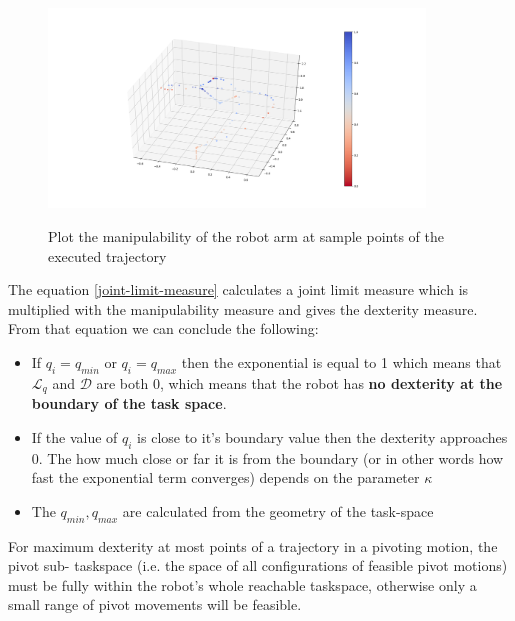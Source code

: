 \begin{center}
\begin{figure}[H]
\centering
\includegraphics[width=10cm]{images/robot-planner1-manipulability-plot.png}\\
\caption{Plot the manipulability of the robot arm at sample points of the executed trajectory}
\end{figure}
\end{center}

The equation \ref{joint-limit-measure} calculates a joint limit measure which is multiplied with the manipulability measure and gives the dexterity measure.
From that equation we can conclude the following:
\begin{itemize}
\item If $q_i = q_{min}$ or $q_i = q_{max}$ then the exponential is equal to 1 which means that $\mathcal{L}_{q}$ and $\mathcal{D}$ are both 0, which means 
that the robot has \textbf{no dexterity at the boundary of the task space}.
\item If the value of $q_i$ is close to it's boundary value then the dexterity approaches 0. The how much close or far it is from the boundary (or in other words 
how fast the exponential term converges) depends on the parameter $\kappa$
\item The $q_{min}, q_{max}$ are calculated from the geometry of the task-space
\end{itemize}

For maximum dexterity at most points of a trajectory in a pivoting motion, the pivot sub-
taskspace (i.e. the space of all configurations of feasible pivot motions) must be fully within 
the robot’s whole reachable taskspace, otherwise only a small range of pivot movements will be 
feasible.
